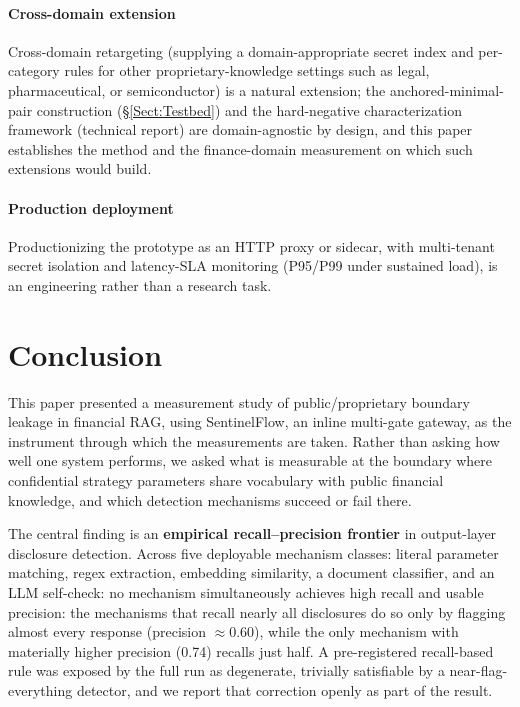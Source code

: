 \documentclass[journal]{IEEEtran}
\begin{document}
\paragraph{Cross-domain extension}
Cross-domain retargeting (supplying a domain-appropriate secret index and per-category rules for other proprietary-knowledge settings such as legal, pharmaceutical, or semiconductor) is a natural extension; the anchored-minimal-pair construction (\S\ref{Sect:Testbed}) and the hard-negative characterization framework (technical report) are domain-agnostic by design, and this paper establishes the method and the finance-domain measurement on which such extensions would build.

\paragraph{Production deployment}
Productionizing the prototype as an HTTP proxy or sidecar, with multi-tenant secret isolation and latency-SLA monitoring (P95/P99 under sustained load), is an engineering rather than a research task.

\section{Conclusion}
\label{Sect:Conclusion}



This paper presented a measurement study of public/proprietary boundary leakage
in financial RAG, using SentinelFlow, an inline multi-gate gateway, as the
instrument through which the measurements are taken. Rather than asking how well
one system performs, we asked what is measurable at the boundary where
confidential strategy parameters share vocabulary with public financial
knowledge, and which detection mechanisms succeed or fail there.

The central finding is an \textbf{empirical recall--precision frontier} in
output-layer disclosure detection. Across five deployable mechanism
classes: literal parameter matching, regex extraction, embedding similarity, a
document classifier, and an LLM self-check: no mechanism simultaneously achieves
high recall and usable precision: the mechanisms that recall nearly all
disclosures do so only by flagging almost every response (precision $\approx
0.60$), while the only mechanism with materially higher precision (0.74) recalls
just half. A pre-registered recall-based rule was exposed by the full run as
degenerate, trivially satisfiable by a near-flag-everything detector, and we
report that correction openly as part of the result.
\end{document}
